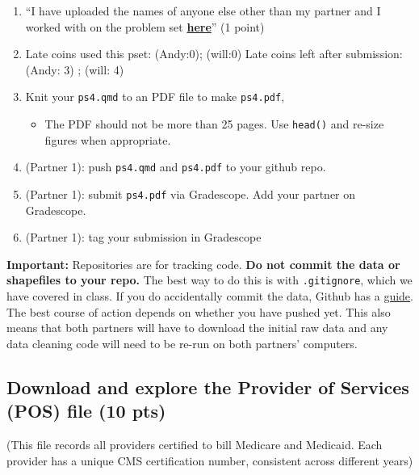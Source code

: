 \documentclass[
  letterpaper,
  DIV=11,
  numbers=noendperiod]{scrartcl}
\providecommand{\tightlist}{%
  \setlength{\itemsep}{0pt}\setlength{\parskip}{0pt}}\usepackage{longtable,booktabs,array}
\begin{document}
\begin{enumerate}
\def\labelenumi{\arabic{enumi}.}
\setcounter{enumi}{4}
\tightlist
\item
  ``I have uploaded the names of anyone else other than my partner and I
  worked with on the problem set
  \textbf{\href{https://docs.google.com/forms/d/185usrCREQaUbvAXpWhChkjghdGgmAZXA3lPWpXLLsts/edit}{here}}''
  (1 point)
\item
  Late coins used this pset: (Andy:0); (will:0) Late coins left after
  submission: (Andy: 3) ; (will: 4)
\item
  Knit your \texttt{ps4.qmd} to an PDF file to make \texttt{ps4.pdf},

  \begin{itemize}
  \tightlist
  \item
    The PDF should not be more than 25 pages. Use \texttt{head()} and
    re-size figures when appropriate.
  \end{itemize}
\item
  (Partner 1): push \texttt{ps4.qmd} and \texttt{ps4.pdf} to your github
  repo.
\item
  (Partner 1): submit \texttt{ps4.pdf} via Gradescope. Add your partner
  on Gradescope.
\item
  (Partner 1): tag your submission in Gradescope
\end{enumerate}

\textbf{Important:} Repositories are for tracking code. \textbf{Do not
commit the data or shapefiles to your repo.} The best way to do this is
with \texttt{.gitignore}, which we have covered in class. If you do
accidentally commit the data, Github has a
\href{https://docs.github.com/en/repositories/working-with-files/managing-large-files/about-large-files-on-github\#removing-files-from-a-repositorys-history}{guide}.
The best course of action depends on whether you have pushed yet. This
also means that both partners will have to download the initial raw data
and any data cleaning code will need to be re-run on both partners'
computers.

\subsection{Download and explore the Provider of Services (POS) file (10
pts)}\label{download-and-explore-the-provider-of-services-pos-file-10-pts}

(This file records all providers certified to bill Medicare and
Medicaid. Each provider has a unique CMS certification number,
consistent across different years)
\end{document}
